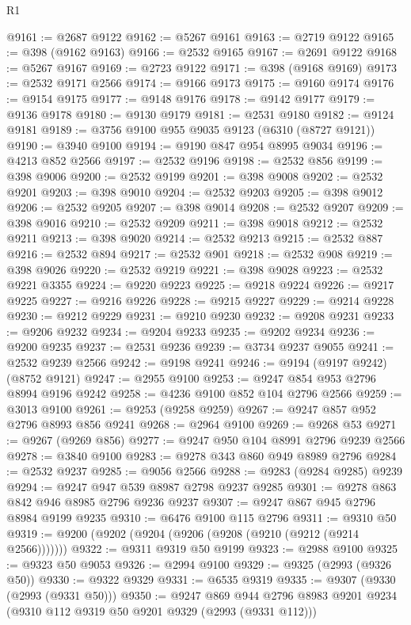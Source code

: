 \begin{lexlean}{R1}
\begin{coremodule}
@9161 := @2687 @9122
@9162 := @5267 @9161
@9163 := @2719 @9122
@9165 := @398 (@9162 @9163)
@9166 := @2532 @9165
@9167 := @2691 @9122
@9168 := @5267 @9167
@9169 := @2723 @9122
@9171 := @398 (@9168 @9169)
@9173 := @2532 @9171 @2566
@9174 := @9166 @9173
@9175 := @9160 @9174
@9176 := @9154 @9175
@9177 := @9148 @9176
@9178 := @9142 @9177
@9179 := @9136 @9178
@9180 := @9130 @9179
@9181 := @2531 @9180
@9182 := @9124 @9181
@9189 := @3756 @9100 @955 @9035 @9123 (@6310 (@8727 @9121))
@9190 := @3940 @9100
@9194 := @9190 @847 @954 @8995 @9034
@9196 := @4213 @852 @2566
@9197 := @2532 @9196
@9198 := @2532 @856
@9199 := @398 @9006
@9200 := @2532 @9199
@9201 := @398 @9008
@9202 := @2532 @9201
@9203 := @398 @9010
@9204 := @2532 @9203
@9205 := @398 @9012
@9206 := @2532 @9205
@9207 := @398 @9014
@9208 := @2532 @9207
@9209 := @398 @9016
@9210 := @2532 @9209
@9211 := @398 @9018
@9212 := @2532 @9211
@9213 := @398 @9020
@9214 := @2532 @9213
@9215 := @2532 @887
@9216 := @2532 @894
@9217 := @2532 @901
@9218 := @2532 @908
@9219 := @398 @9026
@9220 := @2532 @9219
@9221 := @398 @9028
@9223 := @2532 @9221 @3355
@9224 := @9220 @9223
@9225 := @9218 @9224
@9226 := @9217 @9225
@9227 := @9216 @9226
@9228 := @9215 @9227
@9229 := @9214 @9228
@9230 := @9212 @9229
@9231 := @9210 @9230
@9232 := @9208 @9231
@9233 := @9206 @9232
@9234 := @9204 @9233
@9235 := @9202 @9234
@9236 := @9200 @9235
@9237 := @2531 @9236
@9239 := @3734 @9237 @9055
@9241 := @2532 @9239 @2566
@9242 := @9198 @9241
@9246 := @9194 (@9197 @9242) (@8752 @9121)
@9247 := @2955 @9100
@9253 := @9247 @854 @953 @2796 @8994 @9196 @9242
@9258 := @4236 @9100 @852 @104 @2796 @2566
@9259 := @3013 @9100
@9261 := @9253 (@9258 @9259)
@9267 := @9247 @857 @952 @2796 @8993 @856 @9241
@9268 := @2964 @9100
@9269 := @9268 @53
@9271 := @9267 (@9269 @856)
@9277 := @9247 @950 @104 @8991 @2796 @9239 @2566
@9278 := @3840 @9100
@9283 := @9278 @343 @860 @949 @8989 @2796
@9284 := @2532 @9237
@9285 := @9056 @2566
@9288 := @9283 (@9284 @9285) @9239
@9294 := @9247 @947 @539 @8987 @2798 @9237 @9285
@9301 := @9278 @863 @842 @946 @8985 @2796 @9236 @9237
@9307 := @9247 @867 @945 @2796 @8984 @9199 @9235
@9310 := @6476 @9100 @115 @2796
@9311 := @9310 @50
@9319 := @9200 (@9202 (@9204 (@9206 (@9208 (@9210 (@9212 (@9214 @2566)))))))
@9322 := @9311 @9319 @50 @9199
@9323 := @2988 @9100
@9325 := @9323 @50 @9053
@9326 := @2994 @9100
@9329 := @9325 (@2993 (@9326 @50))
@9330 := @9322 @9329
@9331 := @6535 @9319
@9335 := @9307 (@9330 (@2993 (@9331 @50)))
@9350 := @9247
    @869
    @944
    @2796
    @8983
    @9201
    @9234
    (@9310 @112 @9319 @50 @9201 @9329 (@2993 (@9331 @112)))

\end{coremodule}
\end{lexlean}

